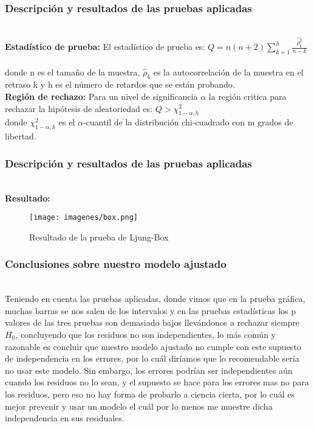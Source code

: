 \documentclass[12pt]{beamer}
\begin{document}
\begin{frame}
\frametitle{Descripción y resultados de las pruebas aplicadas}
~\\ \textbf{Estadístico de prueba:} El estadístico de prueba es: $Q=n(n+2)\sum\limits_{k=1}^{h}\frac{\hat{\rho_{k}^{2}}}{n-k}$
~\\ donde n es el tamaño de la muestra, $\displaystyle {\hat {\rho }}_{k}$  es la autocorrelación de la muestra en el retraso k y h es el número de retardos que se están probando.
~\\ \textbf{Región de rechazo:} Para un nivel de significancia $\alpha$ la región critica para rechazar la hipótesis de aleatoriedad es: $Q>\chi^{2}_{1-\alpha,h}$
~\\donde $\displaystyle \chi _{1-\alpha ,h}^{2}$ es el $\alpha$-cuantil de la distribución chi-cuadrado con m grados de libertad.
\end{frame}

\begin{frame}
\frametitle{Descripción y resultados de las pruebas aplicadas}
~\\ \textbf{Resultado:}\begin{figure}[!h]
    \begin{center}
        \texttt{[image: imagenes/box.png]}
        \caption{Resultado de la prueba de Ljung-Box}
        \label{fig:Densidad}
    \end{center}
\end{figure}
\end{frame}

\begin{frame}
\frametitle{Conclusiones sobre nuestro modelo ajustado}
~\\Teniendo en cuenta las pruebas aplicadas, donde vimos que en la prueba gráfica, muchas barras se nos salen de los intervalos y en las pruebas estadísticas los p valores de las tres pruebas son demasiado bajos llevándonos a rechazar siempre $H_{0}$, concluyendo que los residuos no son independientes, lo más común y razonable es concluir que nuestro modelo ajustado no cumple con este supuesto de independencia en los errores, por lo cuál diríamos que lo recomendable sería no usar este modelo. Sin embargo, los errores podrían ser independientes aún cuando los residuos no lo sean, y el supuesto se hace para los errores mas no para los residuos, pero eso no hay forma de probarlo a ciencia cierta, por lo cuál es mejor prevenir y usar un modelo el cuál por lo menos me muestre dicha independencia en sus residuales.
\end{frame}
\end{document}
